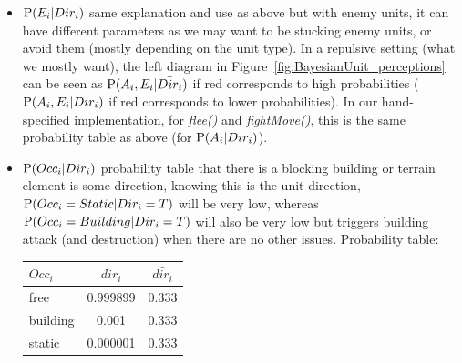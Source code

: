 \begin{itemize}
\item $\mathrm{P}(E_i | Dir_i)$ same explanation and use as above but with enemy units, it can have different parameters as we may want to be stucking enemy units, or avoid them (mostly depending on the unit type). In a repulsive setting (what we mostly want), the left diagram in Figure~\ref{fig:BayesianUnit_perceptions} can be seen as $\mathrm{P}(A_i,E_i | \bar{Dir_i})$ if red corresponds to high probabilities ($\mathrm{P}(A_i,E_i|Dir_i)$ if red corresponds to lower probabilities). In our hand-specified implementation, for \textit{flee()} and \textit{fightMove()}, this is the same probability table as above (for $\mathrm{P}(A_i | Dir_i)$).

\item $\mathrm{P}(Occ_i | Dir_i)$ probability table that there is a blocking building or terrain element is some direction, knowing this is the unit direction, $\mathrm{P}(Occ_i = Static | Dir_i = T)$ will be very low, whereas $\mathrm{P}(Occ_i = Building | Dir_i = T)$ will also be very low but triggers building attack (and destruction) when there are no other issues.
Probability table:\\
\begin{center}
\begin{tabular}{|l|c|c|}
\hline
$Occ_i$ & $dir_i$ & $\bar{dir_i}$ \\
\hline
free & 0.999899 & 0.333 \\
building & 0.001 & 0.333 \\
static & 0.000001 & 0.333 \\
\hline
\end{tabular}
\end{center}

\end{itemize}


